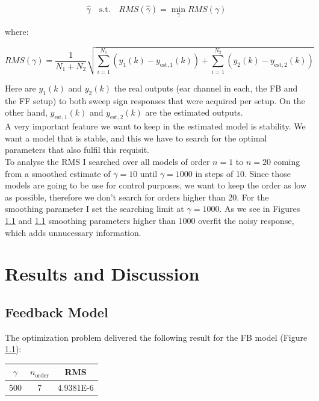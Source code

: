 \[\hat{\gamma} \quad\text{s.t.}\quad RMS(\hat{\gamma}) = \min\limits_\gamma RMS(\gamma)\]

where:

\[RMS(\gamma) = \frac{1}{N_1 + N_2} \sqrt{\sum\limits_{i=1}^{N_1}(y_1(k)-y_{\text{est},1}(k))+\sum\limits_{i=1}^{N_2}(y_2(k)-y_{\text{est},2}(k))}\]

Here are $y_1(k)$ and $y_2(k)$ the real outputs (ear channel in each, the FB and the FF setup) to both sweep sign responses that were acquired per setup. On the other hand, $y_{\text{est},1}(k)$ and $y_{\text{est},2}(k)$ are the estimated outputs.\\

A very important feature we want to keep in the estimated model is stability. We want a model that is stable, and this we have to search for the optimal parameters that also fulfil this requisit.\\

To analyse the RMS I searched over all models of order $n=1$ to $n = 20$ coming from a smoothed estimate of $\gamma = 10$ until $\gamma = 1000$ in steps of 10. Since those models are going to be use for control purposes, we want to keep the order as low as possible, therefore we don't search for orders higher than 20. For the smoothing parameter I set the searching limit at $\gamma = 1000$. As we see in Figures \ref{} and \ref{} smoothing parameters higher than 1000 overfit the noisy response, which adds unnucessary information. \\



\section{Results and Discussion}

\subsection{Feedback Model}
The optimization problem delivered the following result for the FB model (Figure \ref{}):

\begin{table}[H]
\centering
    \begin{tabular}{c|c|c}
    
    $\gamma$ & $n_\text{order}$ & RMS \\ \hline
    500      & 7                &  4.9381E-6   \\ 
    \end{tabular}
\end{table}

